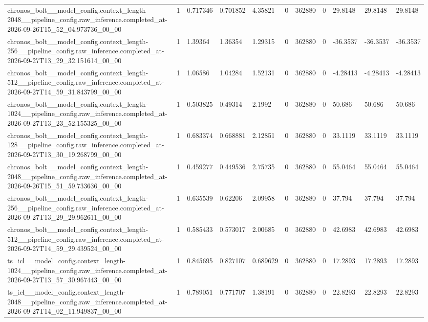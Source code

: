 \begin{tabular}{lllllllllll}
chronos\_bolt\_\_model\_config.context\_length-2048\_\_pipeline\_config.raw\_inference.completed\_at-2026-09-26T15\_52\_04.973736\_00\_00 & 1 & 0.717346 & 0.701852 & 4.35821 & 0 & 362880 & 0 & 29.8148 & 29.8148 & 29.8148 \\
chronos\_bolt\_\_model\_config.context\_length-256\_\_pipeline\_config.raw\_inference.completed\_at-2026-09-27T13\_29\_32.151614\_00\_00 & 1 & 1.39364 & 1.36354 & 1.29315 & 0 & 362880 & 0 & -36.3537 & -36.3537 & -36.3537 \\
chronos\_bolt\_\_model\_config.context\_length-512\_\_pipeline\_config.raw\_inference.completed\_at-2026-09-27T14\_59\_31.843799\_00\_00 & 1 & 1.06586 & 1.04284 & 1.52131 & 0 & 362880 & 0 & -4.28413 & -4.28413 & -4.28413 \\
chronos\_bolt\_\_model\_config.context\_length-1024\_\_pipeline\_config.raw\_inference.completed\_at-2026-09-27T13\_23\_52.155325\_00\_00 & 1 & 0.503825 & 0.49314 & 2.1992 & 0 & 362880 & 0 & 50.686 & 50.686 & 50.686 \\
chronos\_bolt\_\_model\_config.context\_length-128\_\_pipeline\_config.raw\_inference.completed\_at-2026-09-27T13\_30\_19.268799\_00\_00 & 1 & 0.683374 & 0.668881 & 2.12851 & 0 & 362880 & 0 & 33.1119 & 33.1119 & 33.1119 \\
chronos\_bolt\_\_model\_config.context\_length-2048\_\_pipeline\_config.raw\_inference.completed\_at-2026-09-26T15\_51\_59.733636\_00\_00 & 1 & 0.459277 & 0.449536 & 2.75735 & 0 & 362880 & 0 & 55.0464 & 55.0464 & 55.0464 \\
chronos\_bolt\_\_model\_config.context\_length-256\_\_pipeline\_config.raw\_inference.completed\_at-2026-09-27T13\_29\_29.962611\_00\_00 & 1 & 0.635539 & 0.62206 & 2.09958 & 0 & 362880 & 0 & 37.794 & 37.794 & 37.794 \\
chronos\_bolt\_\_model\_config.context\_length-512\_\_pipeline\_config.raw\_inference.completed\_at-2026-09-27T14\_59\_29.439524\_00\_00 & 1 & 0.585433 & 0.573017 & 2.00685 & 0 & 362880 & 0 & 42.6983 & 42.6983 & 42.6983 \\
ts\_icl\_\_model\_config.context\_length-1024\_\_pipeline\_config.raw\_inference.completed\_at-2026-09-27T13\_57\_30.967443\_00\_00 & 1 & 0.845695 & 0.827107 & 0.689629 & 0 & 362880 & 0 & 17.2893 & 17.2893 & 17.2893 \\
ts\_icl\_\_model\_config.context\_length-2048\_\_pipeline\_config.raw\_inference.completed\_at-2026-09-27T14\_02\_11.949837\_00\_00 & 1 & 0.789051 & 0.771707 & 1.38191 & 0 & 362880 & 0 & 22.8293 & 22.8293 & 22.8293 \\

\end{tabular}

